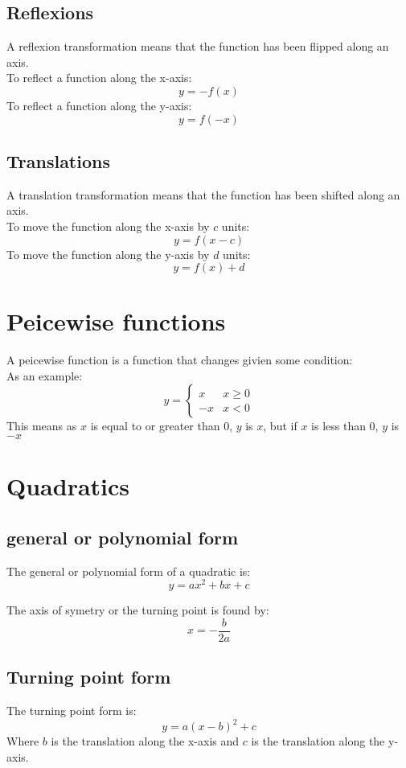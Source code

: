 \documentclass[a4paper,10pt]{report}
\begin{document}
\subsection{Reflexions}
A reflexion transformation means that the function has been flipped along an axis.\\
To reflect a function along the x-axis:
$$
	y = -f(x)
$$
To reflect a function along the y-axis:
$$
	y = f(-x)
$$

\subsection{Translations}
A translation transformation means that the function has been shifted along an axis.\\
To move the function along the x-axis by $c$ units:
$$
	y = f(x - c)
$$
To move the function along the y-axis by $d$ units:
$$
	y = f(x) + d
$$

\section{Peicewise functions}
A peicewise function is a function that changes givien some condition:\\
As an example:
$$
	y = \begin{cases}
		x  & x \geq 0 \\
		-x & x < 0
	\end{cases}
$$
This means as $x$ is equal to or greater than 0, $y$ is $x$, but if $x$ is less than 0, $y$ is $-x$

\section{Quadratics}
\subsection{general or polynomial form}
The general or polynomial form of a quadratic is:
$$
	y = ax^2 + bx + c
$$

The axis of symetry or the turning point is found by:
$$
	x = -\frac{b}{2a}
$$

\subsection{Turning point form}
The turning point form is:
$$
	y = a(x - b)^2 + c
$$
Where $b$ is the translation along the x-axis and $c$ is the translation along the y-axis.
\end{document}
